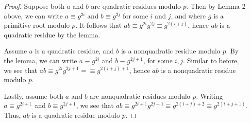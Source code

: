 \documentclass[11pt]{article}
\begin{document}
\begin{proof}
 Suppose both $ a $ and $ b $ are quadratic residues modulo $ p $. Then by Lemma 2 above, we can write $ a \equiv g^{2i} $ and $ b \equiv g^{2j} $ for some $ i $ and $ j $, and where $ g $ is a primitive root modulo $ p $. It follows that $ ab \equiv g^{2i} g^{2j} \equiv g^{2(i + j)} $, hence $ ab $ is a quadratic residue by the lemma.

 Assume $ a $ is a quadratic residue, and $ b $ is a nonquadratic residue modulo $ p $. By the lemma, we can write $ a \equiv g^{2i} $ and $ b \equiv g^{2j+1} $, for some $ i, j $. Similar to before, we see that $ ab \equiv g^{2i} g^{2j+1} =\equiv g^{2(i + j) + 1} $, hence $ ab $ is a nonquadratic residue modulo $ p $.

 Lastly, assume both $ a $ and $ b $ are nonquadratic residues modulo $ p $. Writing $ a \equiv g^{2i+1} $ and $ b \equiv g^{2j+1} $, we see that $ ab \equiv g^{2i+1} g^{2j+1} \equiv g^{2(i + j) + 2} \equiv g^{2(i + j + 1)} $. Thus, $ ab $ is a quadratic residue modulo $ p $.
\end{proof}
\end{document}
